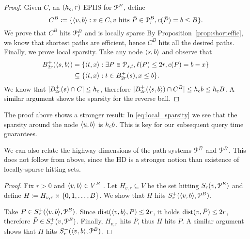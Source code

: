 \begin{proof}
Given $C$, an $(h_c,r)$-EPHS for $\mathcal{P}^E$, define
\begin{equation}\label{eq:hitset}
C^B\coloneqq \{\langle v,b\rangle: v\in C, v \text{ hits }\bar P\in\mathcal{P}^B_r, c(\bar P)=b\leq B \}.
\end{equation}
We prove that $C^B$ hits $\mathcal{P}^B_r$ and is locally sparse
By Proposition~\ref{prop:shorteffic}, we know that shortest paths are efficient, hence $C^B$ hits all the desired paths.
Finally, we prove local sparsity.
Take any node $\langle s,b\rangle$ and observe that
\begin{align}
B^+_{2r}(\langle s,b\rangle) &= \{\langle t,x\rangle: \exists P\in\mathcal{P}_{s,t}, \ell(P)\leq 2r, c(P)=b-x\} \nonumber\\ 
&\subseteq \{\langle t,x\rangle: t\in B^+_{2r}(s), x\leq b\} . \label{eq:local_sparsity}
\end{align}
We know that $\lvert B^+_{2r}(s)\cap C\rvert\leq h_c$, therefore $\lvert B^+_{2r}(\langle s,b\rangle)\cap C^B\rvert\leq h_c b\leq h_c B$.
A similar argument shows the sparsity for the reverse ball.
\end{proof}

The proof above shows a stronger result:
In \cref{eq:local_sparsity} we see that the sparsity around the node $\langle u,b\rangle$ is $h_c b$.
This is key for our subsequent query time guarantees.

We can also relate the highway dimensions of the path systems $\mathcal{P}^E$ and $\mathcal{P}^B$. This does not follow from above, since the HD is a stronger notion than existence of locally-sparse hitting sets.
\begin{proof}
Fix $r>0$ and $\langle v,b\rangle\in V^B$ .
Let $H_{v,r}\subseteq V$ be the set hitting $S_r(v,\mathcal{P}^E)$ and define $H\coloneqq H_{v,r}\times\{0,1,\ldots,B\}$.
We show that $H$ hits $S^+_r(\langle v,b\rangle,\mathcal{P}^B)$.

Take $P\in S^+_r(\langle v,b\rangle,\mathcal{P}^B)$.
Since $\mbox{dist}(\langle v,b\rangle,P)\leq 2r$, it holds $\mbox{dist}(v,\bar P)\leq 2r$, therefore $\bar P\in S^+_r(v,\mathcal{P}^E)$.
Finally, $H_{v,r}$ hits $\bar P$, thus $H$ hits $P$.
A similar argument shows that $H$ hits $S^-_r(\langle v,b\rangle,\mathcal{P}^B)$.
\end{proof}
